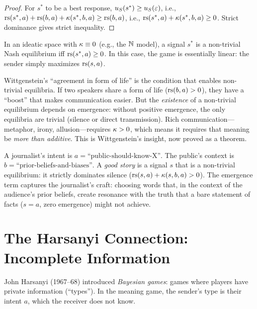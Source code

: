 \begin{proof}
For $s^*$ to be a best response, $u_S(s^*) \geq u_S(\varepsilon)$, i.e.,
$\mathrm{rs}(s^*, a) + \mathrm{rs}(b, a) + \kappa(s^*, b, a) \geq \mathrm{rs}(b, a)$, i.e.,
$\mathrm{rs}(s^*, a) + \kappa(s^*, b, a) \geq 0$. Strict dominance gives strict
inequality.
\end{proof}

\begin{corollary}
\label{cor:zero-emergence}
In an ideatic space with $\kappa \equiv 0$ (e.g., the $\mathbb{N}$ model), a
signal $s^*$ is a non-trivial Nash equilibrium iff $\mathrm{rs}(s^*, a) \geq 0$.
In this case, the game is essentially linear: the sender simply maximizes
$\mathrm{rs}(s, a)$.
\end{corollary}

\begin{interpretation}
Wittgenstein's ``agreement in form of life'' is the condition that enables
non-trivial equilibria. If two speakers share a form of life
($\mathrm{rs}(b, a) > 0$), they have a ``boost'' that makes communication easier.
But the \emph{existence} of a non-trivial equilibrium depends on emergence:
without positive emergence, the only equilibria are trivial (silence or
direct transmission). Rich communication---metaphor, irony, allusion---requires
$\kappa > 0$, which means it requires that meaning be \emph{more than
additive}. This is Wittgenstein's insight, now proved as a theorem.
\end{interpretation}

\begin{example}[Journalism]
A journalist's intent is $a = \text{``public-should-know-X''}$. The public's
context is $b = \text{``prior-beliefs-and-biases''}$. A \emph{good story} is a
signal $s$ that is a non-trivial equilibrium: it strictly dominates silence
($\mathrm{rs}(s, a) + \kappa(s, b, a) > 0$). The emergence term captures the
journalist's craft: choosing words that, in the context of the audience's
prior beliefs, create resonance with the truth that a bare statement of
facts ($s = a$, zero emergence) might not achieve.
\end{example}


\section{The Harsanyi Connection: Incomplete Information}

John Harsanyi (1967--68) introduced \emph{Bayesian games}: games where
players have private information (``types''). In the meaning game, the
sender's type is their intent $a$, which the receiver does not know.

